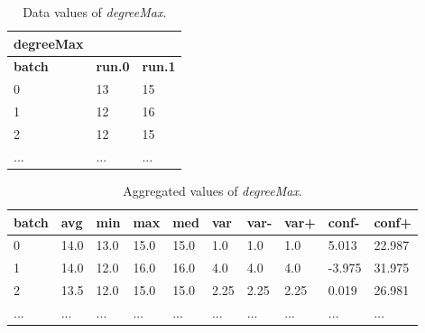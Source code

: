 \begin{table}[h]
\centering
\begin{tabular}[h]{|l|l|l|}\hline
	\textbf{degreeMax} & &\\
	\hline
	\textbf{batch} & \textbf{run.0} & \textbf{run.1}\\
	\hline
	0 & 13 & 15\\
	\hline
	1 & 12 & 16\\
	\hline
	2 & 12 & 15\\
	\hline
	... & ... & ... \\
	\hline
\end{tabular}
\caption{Data values of \textit{degreeMax}.}
\label{tab:degreemax-data}
\end{table}
\begin{table}[h]
\centering
\begin{tabular}[h]{|l|l|l|l|l|l|l|l|l|l|}\hline
	\textbf{batch} & \textbf{avg} & \textbf{min} & \textbf{max} & \textbf{med} & \textbf{var} & \textbf{var-} & \textbf{var+} & \textbf{conf-} & \textbf{conf+}\\
	\hline
	0 & 14.0 & 13.0 & 15.0 & 15.0 & 1.0 & 1.0 & 1.0 & 5.013 & 22.987\\
	\hline
	1 & 14.0 & 12.0 & 16.0 & 16.0 & 4.0 & 4.0 & 4.0 & -3.975 & 31.975\\
	\hline
	2 & 13.5 & 12.0 & 15.0 & 15.0 & 2.25 & 2.25 & 2.25 & 0.019 & 26.981\\
	\hline
	... & ... & ... & ... & ... & ... & ... & ... & ... & ...\\
	\hline
\end{tabular}
\caption{Aggregated values of \textit{degreeMax}.}
\label{tab:degreemax-aggr}
\end{table}

